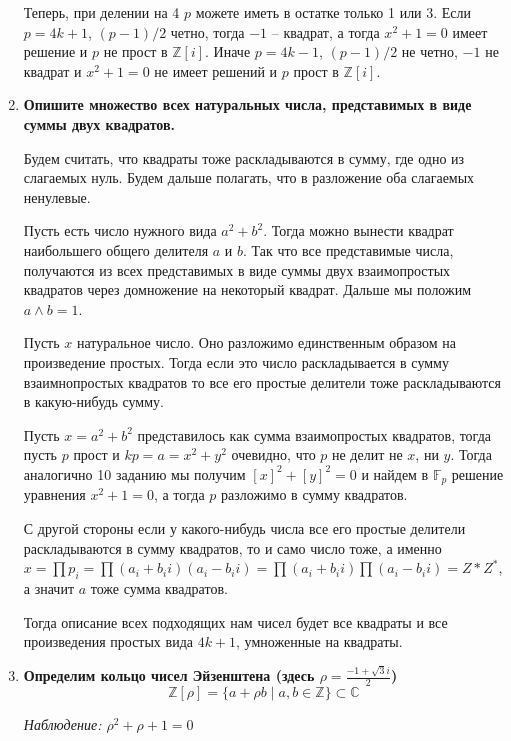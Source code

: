 \documentclass{article}
\begin{document}
\begin{enumerate}
        Теперь, при делении на 4 $p$ можете иметь в остатке только 1 или 3.
        Если $p=4k+1$, $(p-1)/2$ четно, тогда $-1$ – квадрат, а тогда $x^2+1=0$
        имеет решение и
        $p$ не прост в $\mathbb{Z}[i]$. Иначе $p=4k-1$, $(p-1)/2$ не четно,
        $-1$ не квадрат и $x^2+1=0$ не имеет решений и $p$ прост в $\mathbb{Z}[i]$.

    \item \textbf{Опишите множество всех натуральных числа, представимых в виде
        суммы двух квадратов.}
        
        Будем считать, что квадраты тоже раскладываются в сумму, где одно из
        слагаемых нуль. Будем дальше полагать, что в разложение оба слагаемых
        ненулевые.

        Пусть есть число нужного вида $a^2+b^2$. Тогда можно вынести квадрат
        наибольшего общего делителя $a$ и $b$. Так что все представимые числа,
        получаются из всех представимых в виде суммы двух взаимопростых квадратов
        через домножение на некоторый квадрат. Дальше мы положим $a\wedge b=1$.

        Пусть $x$ натуральное число. Оно разложимо единственным образом на
        произведение простых. Тогда если это число раскладывается в сумму
        взаимнопростых квадратов то все его простые делители тоже
        раскладываются в какую-нибудь сумму.

        Пусть $x=a^2+b^2$ представилось как сумма взаимопростых квадратов,
        тогда пусть $p$ прост и $kp=a=x^2+y^2$ очевидно, что $p$ не делит не
        $x$, ни $y$. Тогда аналогично 10 заданию мы получим $[x]^2+[y]^2=0$ и
        найдем в $\mathbb{F}_p$ решение уравнения $x^2+1=0$, а тогда $p$
        разложимо в сумму квадратов.

        С другой стороны если у какого-нибудь числа все его простые делители
        раскладываются в сумму квадратов, то и само число тоже, а именно
        $x=\prod p_i=\prod (a_i+b_ii)(a_i-b_ii)=\prod(a_i+b_ii)\prod(a_i-b_ii)
        =Z*Z^*$, а значит $a$ тоже сумма квадратов.

        Тогда описание всех подходящих нам чисел будет все квадраты и все
        произведения простых вида $4k+1$, умноженные на квадраты.

    \item \textbf{Определим кольцо чисел Эйзенштена (здесь $\rho=\frac{−1+\sqrt3i}{2}$)
        \[\mathbb{Z}[\rho]=\{a+\rho b\;|\;a,b\in\mathbb{Z}\}\subset\mathbb{C}\]}

        \textit{Наблюдение: $\rho^2+\rho+1=0$}


\end{enumerate}
\end{document}
